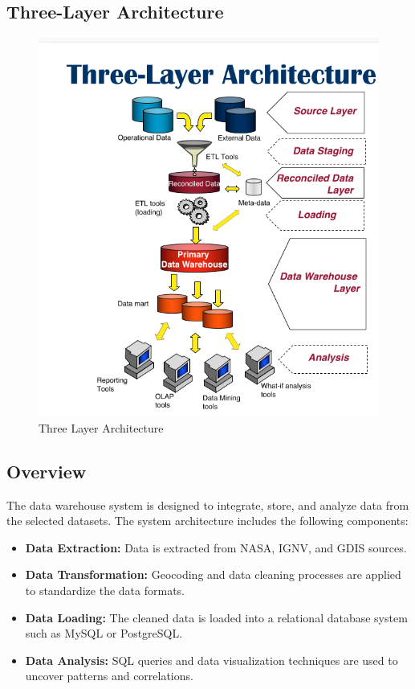 \documentclass[conference]{IEEEtran}
\begin{document}
	\subsection{Three-Layer Architecture}
	\begin{figure}[h]
		\centering
		\includegraphics[width=\columnwidth]{images/three_layer_architecture.png}
		\caption{Three Layer Architecture}
		\label{fig:two layer architecture}
	\end{figure}
	
	
	\subsection{Overview}
	The data warehouse system is designed to integrate, store, and analyze data from the selected datasets. The system architecture includes the following components:
	
	\begin{itemize}
		\item \textbf{Data Extraction:} Data is extracted from NASA, IGNV, and GDIS sources.
		\item \textbf{Data Transformation:} Geocoding and data cleaning processes are applied to standardize the data formats.
		\item \textbf{Data Loading:} The cleaned data is loaded into a relational database system such as MySQL or PostgreSQL.
		\item \textbf{Data Analysis:} SQL queries and data visualization techniques are used to uncover patterns and correlations.
	\end{itemize}
		
\end{document}
